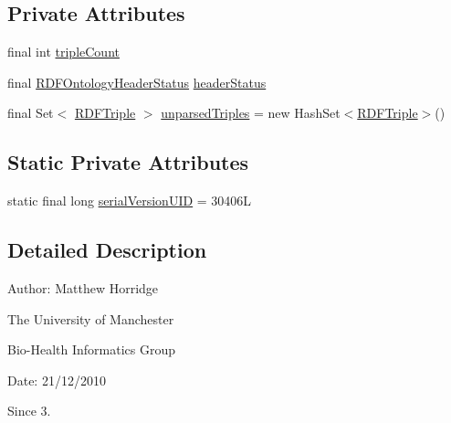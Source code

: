 \subsection*{Private Attributes}
\begin{DoxyCompactItemize}
\item 
final int \hyperlink{classorg_1_1semanticweb_1_1owlapi_1_1io_1_1_r_d_f_parser_meta_data_a98546eecaabb9884e8335e9e8790982f}{triple\-Count}
\item 
final \hyperlink{enumorg_1_1semanticweb_1_1owlapi_1_1io_1_1_r_d_f_ontology_header_status}{R\-D\-F\-Ontology\-Header\-Status} \hyperlink{classorg_1_1semanticweb_1_1owlapi_1_1io_1_1_r_d_f_parser_meta_data_add999edc775e8ab6cfa374bcf01b7ecb}{header\-Status}
\item 
final Set$<$ \hyperlink{classorg_1_1semanticweb_1_1owlapi_1_1io_1_1_r_d_f_triple}{R\-D\-F\-Triple} $>$ \hyperlink{classorg_1_1semanticweb_1_1owlapi_1_1io_1_1_r_d_f_parser_meta_data_aa970fdfd829ac4fe15e10b49ac670c1c}{unparsed\-Triples} = new Hash\-Set$<$\hyperlink{classorg_1_1semanticweb_1_1owlapi_1_1io_1_1_r_d_f_triple}{R\-D\-F\-Triple}$>$()
\end{DoxyCompactItemize}
\subsection*{Static Private Attributes}
\begin{DoxyCompactItemize}
\item 
static final long \hyperlink{classorg_1_1semanticweb_1_1owlapi_1_1io_1_1_r_d_f_parser_meta_data_ab52478dfd14095ae8fab2975a311129e}{serial\-Version\-U\-I\-D} = 30406\-L
\end{DoxyCompactItemize}


\subsection{Detailed Description}
Author\-: Matthew Horridge\par
 The University of Manchester\par
 Bio-\/\-Health Informatics Group\par
 Date\-: 21/12/2010 \begin{DoxySince}{Since}
3. 
\end{DoxySince}


